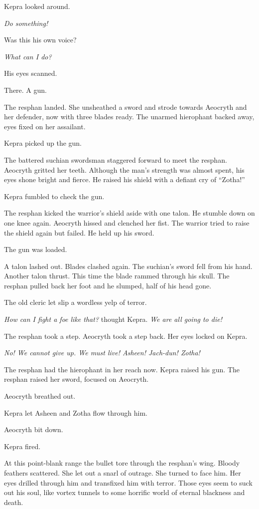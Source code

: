 \documentclass
  [a4paper,
   12pt,
   oneside
  ]%
  {article}
\begin{document}
Kepra looked around. 

\emph{Do something!}

Was this his own voice?

\emph{What can I do?}

His eyes scanned.

There. A gun. 

The resphan landed. She unsheathed a sword and strode towards Aeocryth and her defender, now with three blades ready. The unarmed hierophant backed away, eyes fixed on her assailant. 

Kepra picked up the gun. 

The battered suchian swordsman staggered forward to meet the resphan. 
Aeocryth gritted her teeth. 
Although the man's strength was almost spent, his eyes shone bright and fierce.
He raised his shield with a defiant cry of ``Zotha!''

Kepra fumbled to check the gun. 

The resphan kicked the warrior's shield aside with one talon. 
He stumble down on one knee again. 
Aeocryth hissed and clenched her fist.
The warrior tried to raise the shield again but failed. 
He held up his sword. 

The gun was loaded.

A talon lashed out. Blades clashed again. The suchian’s sword fell from his hand. Another talon thrust. This time the blade rammed through his skull. 
The resphan pulled back her foot and he slumped, half of his head gone.

The old cleric let slip a wordless yelp of terror.

\emph{How can I fight a foe like that?} thought Kepra. \emph{We are all going to die!}

The resphan took a step. Aeocryth took a step back. Her eyes locked on Kepra.

\emph{No! We cannot give up. We must live! Asheen! Jach-dun! Zotha!}

The resphan had the hierophant in her reach now.
Kepra raised his gun. 
The resphan raised her sword, focused on Aeocryth. 

Aeocryth breathed out. 

Kepra let Asheen and Zotha flow through him. 

Aeocryth bit down.

Kepra fired. 

At this point-blank range the bullet tore through the resphan’s wing. 
Bloody feathers scattered. 
She let out a snarl of outrage. 
She turned to face him. 
Her eyes drilled through him and transfixed him with terror. 
Those eyes seem to suck out his soul, like vortex tunnels to some horrific world of eternal blackness and death. 
\end{document}
